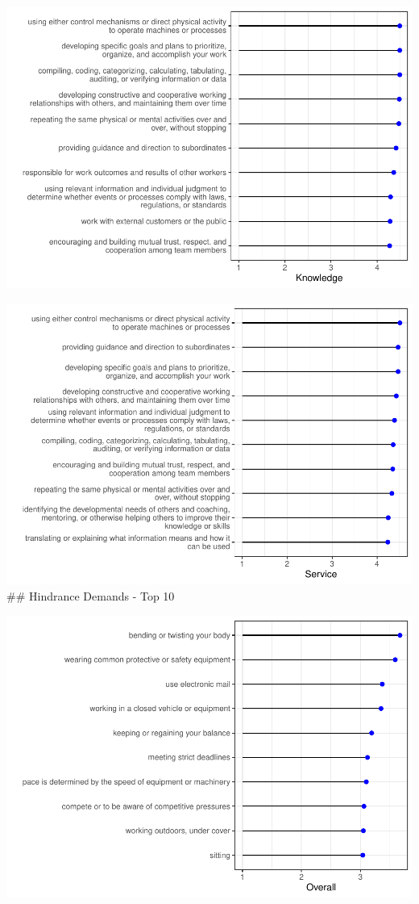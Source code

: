 \documentclass[
  english,
  man]{apa6}
\begin{document}
\includegraphics{SIOPjdr2_files/figure-latex/unnamed-chunk-5-1.pdf}

\includegraphics{SIOPjdr2_files/figure-latex/unnamed-chunk-6-1.pdf}
\#\# Hindrance Demands - Top 10

\includegraphics{SIOPjdr2_files/figure-latex/unnamed-chunk-7-1.pdf}
\end{document}
